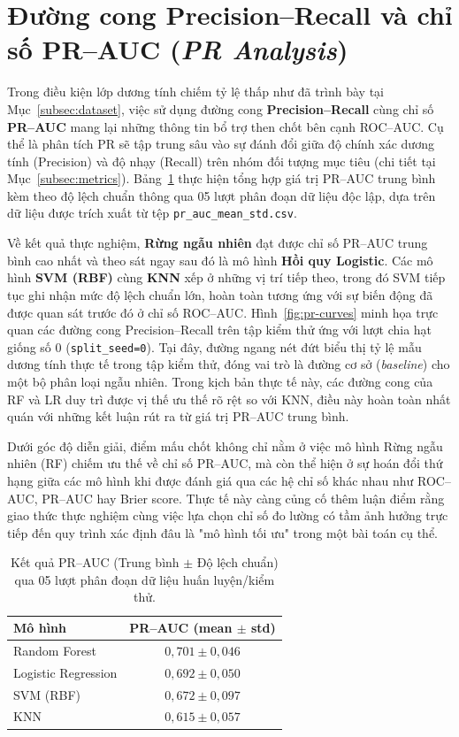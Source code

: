 \documentclass[14pt,a4paper]{extreport}
\begin{document}
\section{Đường cong Precision--Recall và chỉ số PR--AUC (\textit{PR Analysis})}
\label{subsec:prauc}

Trong điều kiện lớp dương tính chiếm tỷ lệ thấp như đã trình bày tại Mục~\ref{subsec:dataset}, việc sử dụng đường cong \textbf{Precision--Recall} cùng chỉ số \textbf{PR--AUC} mang lại những thông tin bổ trợ then chốt bên cạnh ROC--AUC. Cụ thể là phân tích PR sẽ tập trung sâu vào sự đánh đổi giữa độ chính xác dương tính (Precision) và độ nhạy (Recall) trên nhóm đối tượng mục tiêu (chi tiết tại Mục~\ref{subsec:metrics}). Bảng~\ref{tab:results-prauc} thực hiện tổng hợp giá trị PR--AUC trung bình kèm theo độ lệch chuẩn thông qua 05 lượt phân đoạn dữ liệu độc lập, dựa trên dữ liệu được trích xuất từ tệp \texttt{pr\_auc\_mean\_std.csv}.

Về kết quả thực nghiệm, \textbf{Rừng ngẫu nhiên} đạt được chỉ số PR--AUC trung bình cao nhất và theo sát ngay sau đó là mô hình \textbf{Hồi quy Logistic}. Các mô hình \textbf{SVM (RBF)} cùng \textbf{KNN} xếp ở những vị trí tiếp theo, trong đó SVM tiếp tục ghi nhận mức độ lệch chuẩn lớn, hoàn toàn tương ứng với sự biến động đã được quan sát trước đó ở chỉ số ROC--AUC. Hình~\ref{fig:pr-curves} minh họa trực quan các đường cong Precision--Recall trên tập kiểm thử ứng với lượt chia hạt giống số 0 (\texttt{split\_seed=0}). Tại đây, đường ngang nét đứt biểu thị tỷ lệ mẫu dương tính thực tế trong tập kiểm thử, đóng vai trò là đường cơ sở (\textit{baseline}) cho một bộ phân loại ngẫu nhiên. Trong kịch bản thực tế này, các đường cong của RF và LR duy trì được vị thế ưu thế rõ rệt so với KNN, điều này hoàn toàn nhất quán với những kết luận rút ra từ giá trị PR--AUC trung bình.

Dưới góc độ diễn giải, điểm mấu chốt không chỉ nằm ở việc mô hình Rừng ngẫu nhiên (RF) chiếm ưu thế về chỉ số PR--AUC, mà còn thể hiện ở sự hoán đổi thứ hạng giữa các mô hình khi được đánh giá qua các hệ chỉ số khác nhau như ROC--AUC, PR--AUC hay Brier score. Thực tế này càng củng cố thêm luận điểm rằng giao thức thực nghiệm cùng việc lựa chọn chỉ số đo lường có tầm ảnh hưởng trực tiếp đến quy trình xác định đâu là "mô hình tối ưu" trong một bài toán cụ thể.

\begin{table}[htbp]
  \centering
  \caption{Kết quả PR--AUC (Trung bình $\pm$ Độ lệch chuẩn) qua 05 lượt phân đoạn dữ liệu huấn luyện/kiểm thử.}
  \label{tab:results-prauc}
  \begin{tabular}{lc}
    \toprule
    Mô hình & PR--AUC (mean $\pm$ std) \\
    \midrule
    Random Forest         & $0,701 \pm 0,046$ \\
    Logistic Regression   & $0,692 \pm 0,050$ \\
    SVM (RBF)             & $0,672 \pm 0,097$ \\
    KNN                   & $0,615 \pm 0,057$ \\
    \bottomrule
  \end{tabular}
\end{table}
\end{document}

